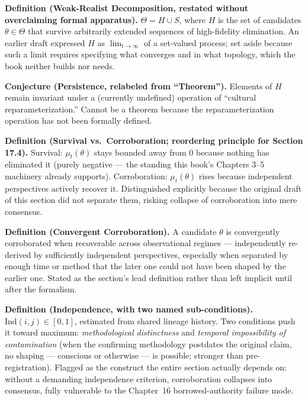 \textbf{Definition (Weak-Realist Decomposition, restated without overclaiming formal apparatus).} $\Theta = H \cup S$, where $H$ is the set of candidates $\theta \in \Theta$ that survive arbitrarily extended sequences of high-fidelity elimination. An earlier draft expressed $H$ as $\lim_{t\to\infty}$ of a set-valued process; set aside because such a limit requires specifying what converges and in what topology, which the book neither builds nor needs.

\textbf{Conjecture (Persistence, relabeled from ``Theorem'').} Elements of $H$ remain invariant under a (currently undefined) operation of ``cultural reparameterization.'' Cannot be a theorem because the reparameterization operation has not been formally defined.

\textbf{Definition (Survival vs.\ Corroboration; reordering principle for Section 17.4).} Survival: $\mu_t(\theta)$ stays bounded away from $0$ because nothing has eliminated it (purely negative --- the standing this book's Chapters 3--5 machinery already supports). Corroboration: $\mu_t(\theta)$ rises because independent perspectives actively recover it. Distinguished explicitly because the original draft of this section did not separate them, risking collapse of corroboration into mere consensus.

\textbf{Definition (Convergent Corroboration).} A candidate $\theta$ is convergently corroborated when recoverable across observational regimes --- independently re-derived by sufficiently independent perspectives, especially when separated by enough time or method that the later one could not have been shaped by the earlier one. Stated as the section's lead definition rather than left implicit until after the formalism.

\textbf{Definition (Independence, with two named sub-conditions).} $\mathrm{Ind}(i,j) \in [0,1]$, estimated from shared lineage history. Two conditions push it toward maximum: \emph{methodological distinctness} and \emph{temporal impossibility of contamination} (when the confirming methodology postdates the original claim, no shaping --- conscious or otherwise --- is possible; stronger than pre-registration). Flagged as the construct the entire section actually depends on: without a demanding independence criterion, corroboration collapses into consensus, fully vulnerable to the Chapter~16 borrowed-authority failure mode.

